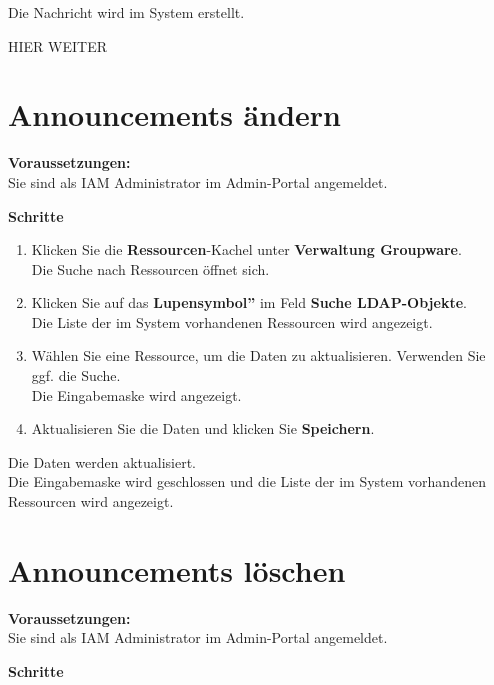 \documentclass[
  letterpaper,
  DIV=11,
  numbers=noendperiod]{scrreprt}
\providecommand{\tightlist}{%
  \setlength{\itemsep}{0pt}\setlength{\parskip}{0pt}}\usepackage{longtable,booktabs,array}
\begin{document}
Die Nachricht wird im System erstellt.

HIER WEITER

\section{Announcements ändern}\label{announcements-uxe4ndern}

\textbf{Voraussetzungen:}\\
Sie sind als IAM Administrator im Admin-Portal angemeldet.

\textbf{Schritte}

\begin{enumerate}
\def\labelenumi{\arabic{enumi}.}
\tightlist
\item
  Klicken Sie die \textbf{Ressourcen}-Kachel unter \textbf{Verwaltung
  Groupware}.\\
  Die Suche nach Ressourcen öffnet sich.\\
\item
  Klicken Sie auf das \textbf{Lupensymbol''} im Feld \textbf{Suche
  LDAP-Objekte}.\\
  Die Liste der im System vorhandenen Ressourcen wird angezeigt.\\
\item
  Wählen Sie eine Ressource, um die Daten zu aktualisieren. Verwenden
  Sie ggf. die Suche.\\
  Die Eingabemaske wird angezeigt.\\
\item
  Aktualisieren Sie die Daten und klicken Sie \textbf{Speichern}.
\end{enumerate}

Die Daten werden aktualisiert.\\
Die Eingabemaske wird geschlossen und die Liste der im System
vorhandenen Ressourcen wird angezeigt.

\section{Announcements löschen}\label{announcements-luxf6schen}

\textbf{Voraussetzungen:}\\
Sie sind als IAM Administrator im Admin-Portal angemeldet.

\textbf{Schritte}
\end{document}
